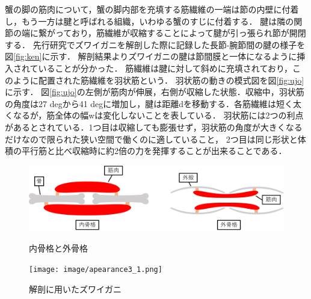 蟹の脚の筋肉について，蟹の脚内部を充填する筋繊維の一端は節の内壁に付着し，もう一方は腱と呼ばれる組織，いわゆる蟹のすじに付着する．
腱は隣の関節の端に繋がっており，筋繊維が収縮することによって腱が引っ張られ節が開閉する．
先行研究\cite{hasegawa}でズワイガニを解剖した際に記録した長節-腕節間の腱の様子を図\ref{fig:ken}に示す．
解剖結果よりズワイガニの腱は節間膜と一体になるように挿入されていることが分かった\cite{hasegawa}．
筋繊維は腱に対して斜めに充填されており，このように配置された筋繊維を羽状筋という．
羽状筋の動きの模式図を図\ref{fig:ujo}に示す．
図\ref{fig:ujo}の左側が筋肉が伸展，右側が収縮した状態．収縮中，羽状筋の角度は27 degから41 degに増加し，腱は距離dを移動する．各筋繊維は短く太くなるが，筋全体の幅wは変化しないことを表している．
羽状筋には2つの利点があるとされている．1つ目は収縮しても膨張せず，羽状筋の角度が大きくなるだけなので限られた狭い空間で働くのに適していること，
2つ目は同じ形状と体積の平行筋と比べ収縮時に約2倍の力を発揮することが出来ることである\cite{warner1977biology}．
\begin{figure}[hb]
  \begin{minipage}{0.49\hsize}
    \vspace{10mm}
    \centering
    \includegraphics[scale=0.058]{image/kokkaku.png}
    \vspace{5mm}
    \caption{内骨格と外骨格\cite{hasegawa}}
    \label{fig:naigai}
  \end{minipage}
  \begin{minipage}{0.49\hsize}
    \centering
    \texttt{[image: image/apearance3\_1.png]}
    \caption{解剖に用いたズワイガニ\cite{hasegawa}}
    \label{fig:zuwai}
  \end{minipage}
\end{figure}
